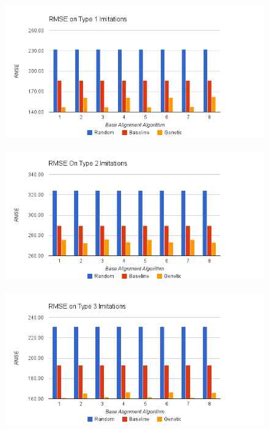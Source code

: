 \begin{figure}[center]
	\centering
	\includegraphics[width=16cm]{images/chart1.png}
	\caption{}
	\label{fig:c1}
\end{figure}
\begin{figure}[center]
	\centering
	\includegraphics[width=16cm]{images/chart8.png}
	\caption{}
	\label{fig:c2}
\end{figure}
\begin{figure}[center]
	\centering
	\includegraphics[width=16cm]{images/chart3.png}
	\caption{}
	\label{fig:c3}
\end{figure}
